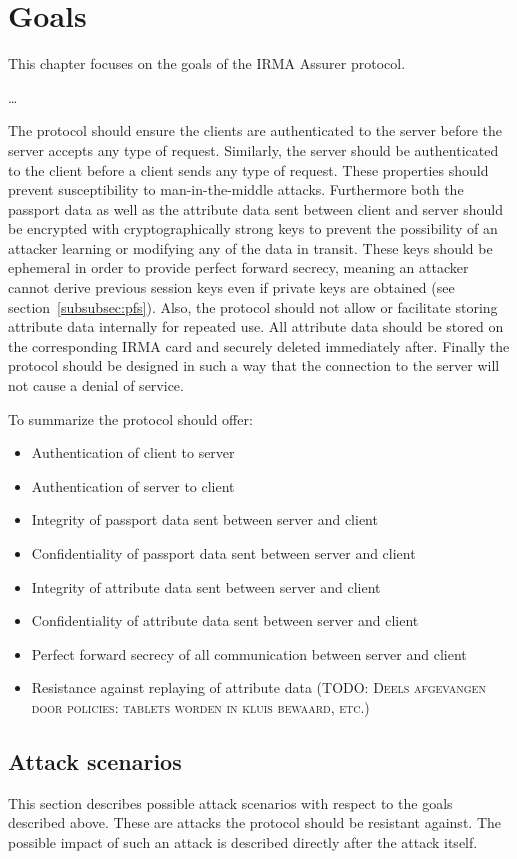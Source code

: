 \section{Goals}
\label{sec:goals}
This chapter focuses on the goals of the IRMA Assurer protocol.

\ldots

The protocol should ensure the clients are authenticated to the server before the server accepts any type of request. Similarly, the server should be authenticated to the client before a client sends any type of request. These properties should prevent susceptibility to man-in-the-middle attacks. Furthermore both the passport data as well as the attribute data sent between client and server should be encrypted with cryptographically strong keys to prevent the possibility of an attacker learning or modifying any of the data in transit. These keys should be ephemeral in order to provide perfect forward secrecy, meaning an attacker cannot derive previous session keys even if private keys are obtained (see section~\ref{subsubsec:pfs}). Also, the protocol should not allow or facilitate storing attribute data internally for repeated use. All attribute data should be stored on the corresponding IRMA card and securely deleted immediately after. Finally the protocol should be designed in such a way that the connection to the server will not cause a denial of service.

To summarize the protocol should offer:
\begin{itemize}
  \item Authentication of client to server
  \item Authentication of server to client
  \item Integrity of passport data sent between server and client
  \item Confidentiality of passport data sent between server and client
  \item Integrity of attribute data sent between server and client
  \item Confidentiality of attribute data sent between server and client
  \item Perfect forward secrecy of all communication between server and client
  \item Resistance against replaying of attribute data (\textsc{TODO: Deels afgevangen door policies: tablets worden in kluis bewaard, etc.})
\end{itemize}

\subsection{Attack scenarios}
This section describes possible attack scenarios with respect to the goals described above. These are attacks the protocol should be resistant against. The possible impact of such an attack is described directly after the attack itself.


